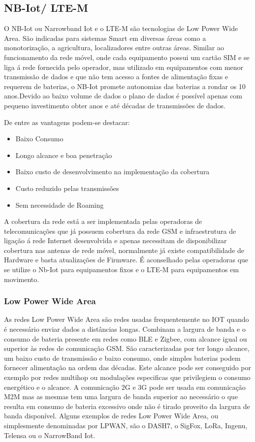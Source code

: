 \subsection {NB-Iot/ LTE-M}
O NB-Iot ou Narrowband Iot  e o LTE-M são tecnologias de Low Power Wide Area. São indicadas para sistemas Smart em diversas áreas como a monotorização, a agricultura, localizadores entre outras áreas. Similar ao funcionamento da rede móvel, onde cada equipamento possui um cartão SIM e se liga á rede fornecida pelo operador, mas utilizado em equipamentos com menor transmissão de dados e que não tem acesso a fontes de alimentação fixas e requerem de baterias, o NB-Iot promete autonomias das baterias a rondar os 10 anos\cite{u_2017}.Devido ao baixo volume de dados o plano de dados é possível apenas com pequeno investimento obter anos e até décadas de transmissões de dados.
\par De entre as vantagens podem-se destacar:
\begin{itemize}
\item Baixo Consumo
\item Longo alcance e boa penetração
\item Baixo custo de desenvolvimento na implementação da cobertura
\item Custo reduzido pelas transmissões
\item Sem necessidade de Roaming
\end{itemize}
\par
A cobertura da rede está a ser implementada pelas operadoras de telecomunicações que já possuem cobertura da rede GSM e infraestrutura de ligação á rede Internet desenvolvida e apenas necessitam de 
disponibilizar cobertura nas antenas de rede móvel, normalmente já existe compatibilidade de Hardware e basta atualizações de Firmware. É aconselhado pelas operadoras que se utilize o Nb-Iot para equipamentos fixos e o LTE-M para equipamentos em movimento.

\subsubsection { Low Power Wide Area}
As redes Low Power Wide Area são redes usadas frequentemente no IOT quando é necessário enviar dados a distâncias longas. Combinam a largura de banda e o consumo de bateria presente em redes como BLE e Zigbee, com alcance igual ou superior às redes de comunicação GSM. São caracterizadas por ter longo alcance, um baixo custo de transmissão e baixo consumo, onde simples baterias podem fornecer alimentação na ordem das décadas. Este alcance pode ser conseguido por exemplo por redes multihop ou modulações especificas que privilegiem o consumo energético e o alcance. A comunicação 2G e 3G pode ser usada em comunicação M2M mas as mesmas tem uma largura de banda superior ao necessário o que resulta em consumo de bateria excessivo onde não é tirado proveito da largura de banda disponível. Alguns exemplos de redes Low Power Wide Area, ou simplesmente denominadas por LPWAN, são o DASH7, o SigFox, LoRa, Ingenu, Telensa ou o NarrowBand Iot.\cite{lpwanoverview}

